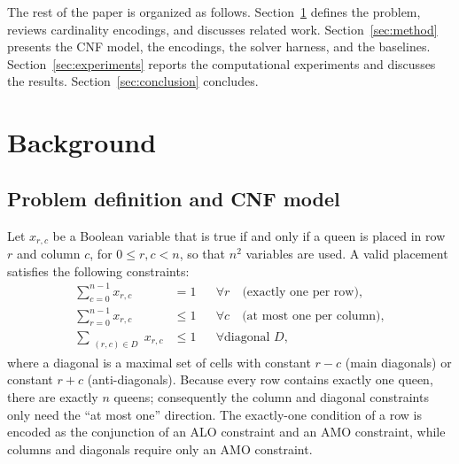 \documentclass[a4paper,fleqn]{cas-sc}
\begin{document}
The rest of the paper is organized as follows. Section~\ref{sec:background}
defines the problem, reviews cardinality encodings, and discusses related work.
Section~\ref{sec:method} presents the CNF model, the encodings, the solver
harness, and the baselines. Section~\ref{sec:experiments} reports the
computational experiments and discusses the results. Section~\ref{sec:conclusion}
concludes.

\section{Background}\label{sec:background}

\subsection{Problem definition and CNF model}
Let $x_{r,c}$ be a Boolean variable that is true if and only if a queen is placed
in row $r$ and column $c$, for $0 \leq r,c < n$, so that $n^2$ variables are
used. A valid placement satisfies the following constraints:
\begin{align}
  \sum_{c=0}^{n-1} x_{r,c} &= 1 && \forall r \quad \text{(exactly one per row)},\\
  \sum_{r=0}^{n-1} x_{r,c} &\leq 1 && \forall c \quad \text{(at most one per column)},\\
  \sum_{\substack{(r,c)\in D}} x_{r,c} &\leq 1 && \forall \text{diagonal } D ,
\end{align}
where a diagonal is a maximal set of cells with constant $r-c$ (main diagonals)
or constant $r+c$ (anti-diagonals). Because every row contains exactly one queen,
there are exactly $n$ queens; consequently the column and diagonal constraints
only need the ``at most one'' direction. The exactly-one condition of a row is
encoded as the conjunction of an ALO constraint and an AMO constraint, while
columns and diagonals require only an AMO constraint.
\end{document}
